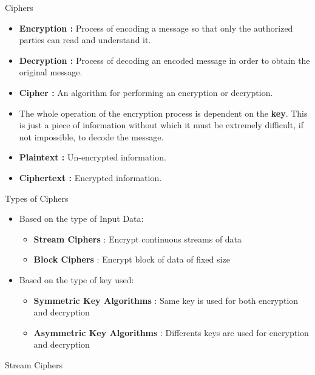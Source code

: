 \documentclass{beamer}
\begin{document}
\begin{frame}{Ciphers}
    \begin{itemize}
        \item \textbf{Encryption : } Process of encoding a message so that only the authorized parties can read and understand it.
        \item \textbf{Decryption : } Process of decoding an encoded message in order to obtain the original message.
        \item \textbf{Cipher : } An algorithm for performing an encryption or decryption.
        \item The whole operation of the encryption process is dependent on the \textbf{key}. This is just a piece of information without which it must be extremely difficult, if not impossible, to decode the message.
        \item \textbf{Plaintext : } Un-encrypted information.
        \item \textbf{Ciphertext : } Encrypted information.
    \end{itemize}
\end{frame}

\begin{frame}{Types of Ciphers}
    \begin{itemize}
        \item Based on the type of Input Data:
            \begin{itemize}
                \item \textbf{Stream Ciphers} : Encrypt continuous streams of data
                \item \textbf{Block Ciphers} : Encrypt block of data of fixed size 
            \end{itemize}
        \item Based on the type of key used:
                \begin{itemize}
                    \item \textbf{Symmetric Key Algorithms} : Same key is used for both encryption and decryption
                    \item \textbf{Asymmetric Key Algorithms} : Differents keys are used for encryption and decryption
                \end{itemize}
    \end{itemize}
\end{frame}

\begin{frame}{Stream Ciphers}

\end{frame}
\end{document}
